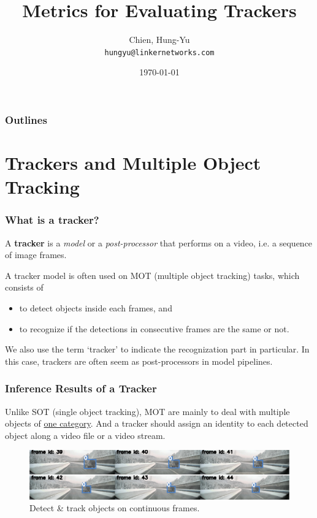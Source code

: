 \documentclass[slidetop, mathserif]{beamer}
\title[Metrics for Tracking]{Metrics for Evaluating Trackers}
\author[chy1010]{Chien, Hung-Yu \\ {\small\tt hungyu@linkernetworks.com}}
\date{\today}
\begin{document}
\begin{frame}
	\titlepage
\end{frame}

\section[Outline]{}
\begin{frame}
	\frametitle{Outlines}
	\tableofcontents
\end{frame}



\section{Trackers and Multiple Object Tracking}

\begin{frame}
	\frametitle{What is a tracker?}

	A {\bf tracker} is a \emph{model} or a \emph{post-processor}
	that performs on a video, i.e. a sequence of image frames.

	\quad

	A tracker model is often used on MOT (multiple object tracking) tasks,
	which consists of
	\begin{itemize}
	\item
		to detect objects inside each frames, and
	\item
		to recognize if the detections in consecutive frames are the
		same or not.
	\end{itemize}

	\quad

	We also use the term `tracker' to indicate the recognization part
	in particular. In this case, trackers are often seem as post-processors
	in model pipelines.

\end{frame}



\begin{frame}
	\frametitle{Inference Results of a Tracker}

	Unlike SOT (single object tracking), MOT are mainly to deal with
	multiple objects of \underline{one category}.
	And a tracker should assign
	an identity to each detected object along a video file or a video
	stream.

	\begin{figure}
		\includegraphics[width=1.05\textwidth]{pics/track01.png}
		\caption{Detect \& track objects on continuous frames.}
	\end{figure}

\end{frame}
\end{document}
